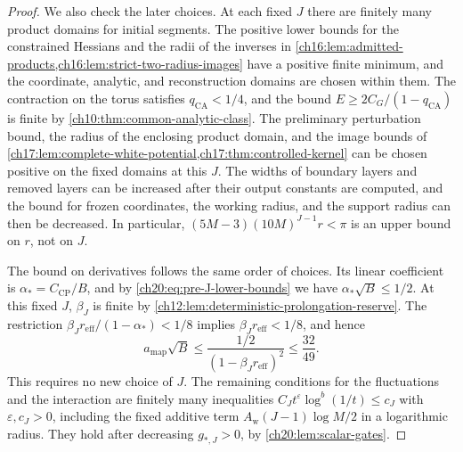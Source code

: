 \begin{proof}
We also check the later choices. At each fixed $J$ there are finitely many product domains for initial segments. The positive lower bounds for the constrained Hessians and the radii of the inverses in \cref{ch16:lem:admitted-products,ch16:lem:strict-two-radius-images} have a positive finite minimum, and the coordinate, analytic, and reconstruction domains are chosen within them. The contraction on the torus satisfies $q_{\mathrm{CA}}<1/4$, and the bound $E\ge2C_G/(1-q_{\mathrm{CA}})$ is finite by \cref{ch10:thm:common-analytic-class}. The preliminary perturbation bound, the radius of the enclosing product domain, and the image bounds of \cref{ch17:lem:complete-white-potential,ch17:thm:controlled-kernel} can be chosen positive on the fixed domains at this $J$. The widths of boundary layers and removed layers can be increased after their output constants are computed, and the bound for frozen coordinates, the working radius, and the support radius can then be decreased. In particular, $(5M-3)(10M)^{J-1}r<\pi$ is an upper bound on $r$, not on $J$.

The bound on derivatives follows the same order of choices. Its linear coefficient is $\alpha_*=C_{\mathrm{CP}}/B$, and by \eqref{ch20:eq:pre-J-lower-bounds} we have $\alpha_*\sqrt B\le1/2$. At this fixed $J$, $\beta_J$ is finite by \cref{ch12:lem:deterministic-prolongation-reserve}. The restriction $\beta_Jr_{\mathrm{eff}}/(1-\alpha_*)<1/8$ implies $\beta_Jr_{\mathrm{eff}}<1/8$, and hence
\[
 a_{\mathrm{map}}\sqrt B\le\frac{1/2}{(1-\beta_Jr_{\mathrm{eff}})^2}\le\frac{32}{49}.
\]
This requires no new choice of $J$. The remaining conditions for the fluctuations and the interaction are finitely many inequalities $C_Jt^\varepsilon\log^b(1/t)\le c_J$ with $\varepsilon,c_J>0$, including the fixed additive term $A_{\mathrm w}(J-1)\log M/2$ in a logarithmic radius. They hold after decreasing $g_{*,J}>0$, by \cref{ch20:lem:scalar-gates}.


\end{proof}
